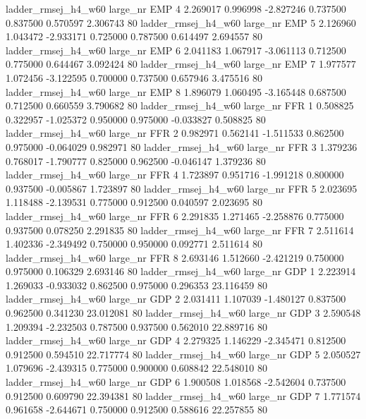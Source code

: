 ladder_rmsej_h4_w60   large_nr      EMP                 4  2.269017  0.996998  -2.827246 0.737500 0.837500  0.570597    2.306743 80
ladder_rmsej_h4_w60   large_nr      EMP                 5  2.126960  1.043472  -2.933171 0.725000 0.787500  0.614497    2.694557 80
ladder_rmsej_h4_w60   large_nr      EMP                 6  2.041183  1.067917  -3.061113 0.712500 0.775000  0.644467    3.092424 80
ladder_rmsej_h4_w60   large_nr      EMP                 7  1.977577  1.072456  -3.122595 0.700000 0.737500  0.657946    3.475516 80
ladder_rmsej_h4_w60   large_nr      EMP                 8  1.896079  1.060495  -3.165448 0.687500 0.712500  0.660559    3.790682 80
ladder_rmsej_h4_w60   large_nr      FFR                 1  0.508825  0.322957  -1.025372 0.950000 0.975000 -0.033827    0.508825 80
ladder_rmsej_h4_w60   large_nr      FFR                 2  0.982971  0.562141  -1.511533 0.862500 0.975000 -0.064029    0.982971 80
ladder_rmsej_h4_w60   large_nr      FFR                 3  1.379236  0.768017  -1.790777 0.825000 0.962500 -0.046147    1.379236 80
ladder_rmsej_h4_w60   large_nr      FFR                 4  1.723897  0.951716  -1.991218 0.800000 0.937500 -0.005867    1.723897 80
ladder_rmsej_h4_w60   large_nr      FFR                 5  2.023695  1.118488  -2.139531 0.775000 0.912500  0.040597    2.023695 80
ladder_rmsej_h4_w60   large_nr      FFR                 6  2.291835  1.271465  -2.258876 0.775000 0.937500  0.078250    2.291835 80
ladder_rmsej_h4_w60   large_nr      FFR                 7  2.511614  1.402336  -2.349492 0.750000 0.950000  0.092771    2.511614 80
ladder_rmsej_h4_w60   large_nr      FFR                 8  2.693146  1.512660  -2.421219 0.750000 0.975000  0.106329    2.693146 80
ladder_rmsej_h4_w60   large_nr      GDP                 1  2.223914  1.269033  -0.933032 0.862500 0.975000  0.296353   23.116459 80
ladder_rmsej_h4_w60   large_nr      GDP                 2  2.031411  1.107039  -1.480127 0.837500 0.962500  0.341230   23.012081 80
ladder_rmsej_h4_w60   large_nr      GDP                 3  2.590548  1.209394  -2.232503 0.787500 0.937500  0.562010   22.889716 80
ladder_rmsej_h4_w60   large_nr      GDP                 4  2.279325  1.146229  -2.345471 0.812500 0.912500  0.594510   22.717774 80
ladder_rmsej_h4_w60   large_nr      GDP                 5  2.050527  1.079696  -2.439315 0.775000 0.900000  0.608842   22.548010 80
ladder_rmsej_h4_w60   large_nr      GDP                 6  1.900508  1.018568  -2.542604 0.737500 0.912500  0.609790   22.394381 80
ladder_rmsej_h4_w60   large_nr      GDP                 7  1.771574  0.961658  -2.644671 0.750000 0.912500  0.588616   22.257855 80
